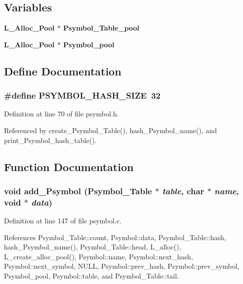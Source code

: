 \subsection*{Variables}
\begin{CompactItemize}
\item 
\bf{L\_\-Alloc\_\-Pool} $\ast$ \bf{Psymbol\_\-Table\_\-pool}
\item 
\bf{L\_\-Alloc\_\-Pool} $\ast$ \bf{Psymbol\_\-pool}
\end{CompactItemize}


\subsection{Define Documentation}
\subsubsection{\setlength{\rightskip}{0pt plus 5cm}\#define PSYMBOL\_\-HASH\_\-SIZE~32}\label{psymbol_8h_1ed9f6da28a1feac75a73da72e0937b9}




Definition at line 70 of file psymbol.h.

Referenced by create\_\-Psymbol\_\-Table(), hash\_\-Psymbol\_\-name(), and print\_\-Psymbol\_\-hash\_\-table().

\subsection{Function Documentation}
\subsubsection{\setlength{\rightskip}{0pt plus 5cm}void add\_\-Psymbol (\bf{Psymbol\_\-Table} $\ast$ {\em table}, char $\ast$ {\em name}, void $\ast$ {\em data})}\label{psymbol_8h_43c4935d67bb3583c3e7f4a50bc07bff}




Definition at line 147 of file psymbol.c.

References Psymbol\_\-Table::count, Psymbol::data, Psymbol\_\-Table::hash, hash\_\-Psymbol\_\-name(), Psymbol\_\-Table::head, L\_\-alloc(), L\_\-create\_\-alloc\_\-pool(), Psymbol::name, Psymbol::next\_\-hash, Psymbol::next\_\-symbol, NULL, Psymbol::prev\_\-hash, Psymbol::prev\_\-symbol, Psymbol\_\-pool, Psymbol::table, and Psymbol\_\-Table::tail.

